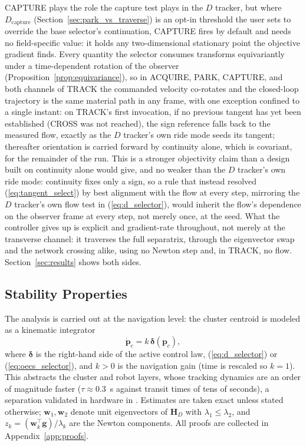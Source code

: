 \documentclass[lettersize,journal]{IEEEtran}
\begin{document}
CAPTURE plays the role the capture test plays in the $D$ tracker, but
where $D_{\text{capture}}$ (Section~\ref{sec:park_vs_traverse}) is an
opt-in threshold the user sets to override the base selector's
continuation, CAPTURE fires by default and needs no field-specific
value: it holds any two-dimensional stationary point the objective
gradient finds. Every quantity the selector consumes transforms
equivariantly under a time-dependent rotation of the observer
(Proposition~\ref{prop:equivariance}), so in ACQUIRE, PARK, CAPTURE, and
both channels of TRACK the commanded velocity co-rotates and the
closed-loop trajectory is the same material path in any frame, with one
exception confined to a single instant: on TRACK's first invocation, if
no previous tangent has yet been established (CROSS was not reached),
the sign reference falls back to the measured flow, exactly as the $D$
tracker's own ride mode seeds its tangent; thereafter orientation is
carried forward by continuity alone, which is covariant, for the
remainder of the run. This is a stronger objectivity claim than a
design built on continuity alone would give, and no weaker than the $D$
tracker's own ride mode: continuity fixes only a sign, so a rule that
instead resolved (\ref{eq:tangent_select}) by best alignment with the
flow at every step, mirroring the $D$ tracker's own flow test in
(\ref{eq:d_selector}), would inherit the flow's dependence on the
observer frame at every step, not merely once, at the seed. What the controller
gives up is explicit and gradient-rate throughout, not merely at the
transverse channel: it traverses the full separatrix, through the
eigenvector swap and the network crossing alike, using no Newton step
and, in TRACK, no flow. Section~\ref{sec:results} shows both sides.

\subsection{Stability Properties}
\label{sec:stability}

The analysis is carried out at the navigation level: the cluster
centroid is modeled as a kinematic integrator
\begin{equation}
    \dot{\mathbf{p}}_c = k\,\boldsymbol{\delta}(\mathbf{p}_c),
    \label{eq:kinematic_model}
\end{equation}
where $\boldsymbol{\delta}$ is the right-hand side of the active
control law, (\ref{eq:d_selector}) or (\ref{eq:oecs_selector}), and
$k > 0$ is the navigation gain (time is rescaled so $k = 1$). This abstracts the
cluster and robot layers, whose tracking dynamics are an order of
magnitude faster ($\tau \approx 0.3$~s against transit times of tens of
seconds), a separation validated in hardware in \cite{14}. Estimates
are taken exact unless stated otherwise; $\mathbf{w}_1, \mathbf{w}_2$
denote unit eigenvectors of $\mathbf{H}_D$ with $\lambda_1 \leq
\lambda_2$, and $z_k = (\mathbf{w}_k^\top \mathbf{g})/\lambda_k$ are
the Newton components. All proofs are collected in
Appendix~\ref{app:proofs}.
\end{document}
